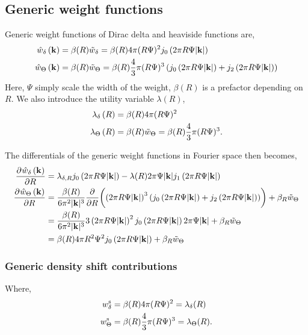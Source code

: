 \documentclass[12pt, letterpaper]{article}
\newcommand*{\pd}[3][]{\frac{\partial^{#1}#2}{\partial{#3}^{#1}}}%
\newcommand*{\lb}{\ensuremath{\left(}}
\newcommand*{\rb}{\ensuremath{\right)}}
\begin{document}
\subsection{Generic weight functions}
Generic weight functions of Dirac delta and heaviside functions are,
\begin{align}
  \label{eq:generic_weight_functions_fourier}
  \hat{w}_\delta \lb \mathbf{k}\rb &=  \beta(R) \tilde{w}_\delta = \beta(R) 4 \pi (R \Psi)^2 j_0\lb 2 \pi R \Psi |\mathbf{k}| \rb \\
  \hat{w}_\Theta \lb \mathbf{k}\rb &=  \beta(R) \tilde{w}_\Theta = \beta(R) \frac{4}{3} \pi (R\Psi)^3 \lb j_0\lb 2 \pi R\Psi |\mathbf{k}| \rb + j_2\lb 2 \pi R\Psi |\mathbf{k}| \rb \rb  \\
\end{align}
Here, $\Psi$ simply scale the width of the weight, $\beta(R)$ is a
prefactor depending on $R$. We also introduce the utility variable
$\lambda(R)$,
\begin{align}
  \label{eq:lambdas}
  \lambda_\delta \lb R \rb &=  \beta(R) 4 \pi (R \Psi)^2  \\
  \lambda_\Theta  \lb R \rb &=  \beta(R) \tilde{w}_\Theta = \beta(R) \frac{4}{3} \pi (R\Psi)^3.
\end{align}

The differentials of the generic weight functions in Fourier space then becomes,
\begin{align}
  \label{eq:generic_weight_functions_fourier_diff}
  \pd{\hat{w}_\delta \lb \mathbf{k}\rb}{R} &=  \lambda_{\delta,R} j_0\lb 2 \pi R \Psi |\mathbf{k}| \rb - \lambda(R) 2 \pi \Psi |\mathbf{k}| j_1\lb 2 \pi R \Psi |\mathbf{k}| \rb  \\
  \pd{\hat{w}_\Theta \lb \mathbf{k}\rb}{R}  &=  \frac{\beta(R)}{6 \pi^2 |\mathbf{k}|^3} \pd{}{R}\biggl( \lb 2 \pi R \Psi |\mathbf{k}|\rb ^3 \lb j_0\lb 2 \pi R \Psi |\mathbf{k}| \rb + j_2\lb 2 \pi R \Psi |\mathbf{k}| \rb \rb \biggr) + \beta_R \tilde{w}_\Theta  \nonumber \\
                                           &=  \frac{\beta(R)}{6 \pi^2 |\mathbf{k}|^3} 3 \lb 2 \pi R \Psi |\mathbf{k}|\rb ^2  j_0\lb 2 \pi R \Psi |\mathbf{k}| \rb 2 \pi \Psi |\mathbf{k}| + \beta_R \tilde{w}_\Theta \nonumber  \\
                                           &=  \beta(R) 4 \pi R^2 \Psi^2 j_0\lb 2 \pi R \Psi |\mathbf{k}| \rb + \beta_R \tilde{w}_\Theta
\end{align}


\subsubsection{Generic density shift contributions}
Where,
\begin{align}
  \label{eq:generic_weight_functions_steady}
  w_\delta^{\rm{s}} &= \beta(R) 4 \pi (R \Psi)^2 = \lambda_\delta(R)  \\
  w_\Theta^{\rm{s}} &= \beta(R) \frac{4}{3} \pi (R \Psi)^3 = \lambda_\Theta(R).
\end{align}
\end{document}
